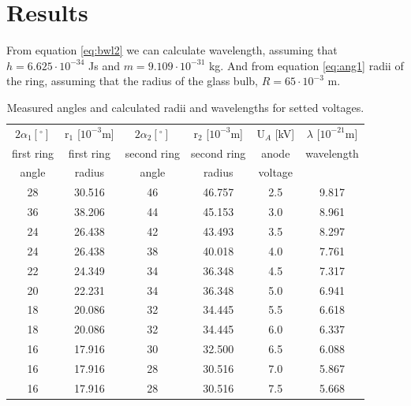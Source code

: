 \documentclass[a4paper,12pt]{article}
\begin{document}
\section{Results}
From equation \ref{eq:bwl2} we can calculate wavelength, assuming that $h = 6.625 \cdot 10^{-34}$ Js and $m = 9.109 \cdot 10 ^ {-31}$ kg. And from equation \ref{eq:ang1} radii of the ring, assuming that the radius of the glass bulb, $R = 65 \cdot 10^{-3}$ m.
\begin{table}[h]
    \begin{center}
        \caption{Measured angles and calculated radii and wavelengths for setted voltages.}
        \label{tab:resoults}
        \begin{tabular}{|c|c|c|c|c|c|}
            \hline
            $2\alpha_1 [^\circ]$ & r$_1$ [$10^{-3}$m] & $2\alpha_2 [^\circ]$ & r$_2$ [$10^{-3}$m] & U$_A$ [kV] & $\lambda$ [$10^{-21}$m] \\
            first ring & first ring & second ring & second ring & anode & wavelength \\ 
            angle & radius & angle & radius & voltage & \\
            \hline 
            28 & 30.516 & 46 & 46.757 & 2.5 & 9.817 \\
            \hline
            36 & 38.206 & 44 & 45.153 & 3.0 & 8.961 \\
            \hline
            24 & 26.438 & 42 & 43.493 & 3.5 & 8.297 \\
            \hline
            24 & 26.438 & 38 & 40.018 & 4.0 & 7.761 \\
            \hline
            22 & 24.349 & 34 & 36.348 & 4.5 & 7.317 \\
            \hline
            20 & 22.231 & 34 & 36.348 & 5.0 & 6.941 \\
            \hline
            18 & 20.086 & 32 & 34.445 & 5.5 & 6.618 \\
            \hline
            18 & 20.086 & 32 & 34.445 & 6.0 & 6.337 \\
            \hline
            16 & 17.916 & 30 & 32.500 & 6.5 & 6.088 \\
            \hline
            16 & 17.916 & 28 & 30.516 & 7.0 & 5.867 \\
            \hline
            16 & 17.916 & 28 & 30.516 & 7.5 & 5.668 \\
            \hline
        \end{tabular}
    \end{center}
\end{table}
\end{document}
